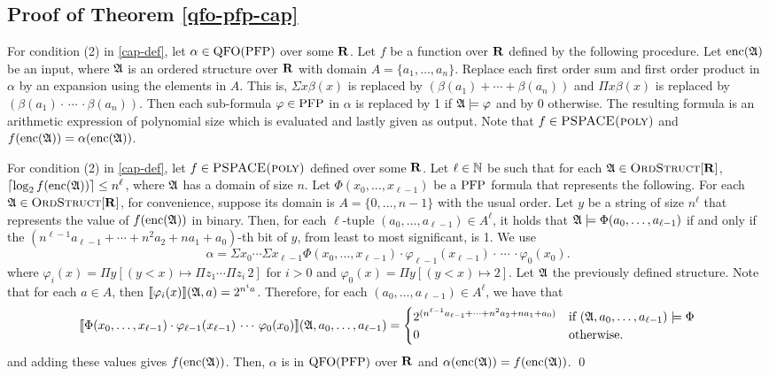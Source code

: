 \subsection{Proof of Theorem \ref{qfo-pfp-cap}}

For condition (2) in \ref{cap-def}, let $\alpha\in{\rm QFO}({\rm PFP})$ over some $\mathbf{R}$. Let $f$ be a function over $\mathbf{R}$ defined by the following procedure. Let ${\rm enc}(\mathfrak{A})$ be an input, where $\mathfrak{A}$ is an ordered structure over $\mathbf{R}$ with domain $A = \{a_1,\ldots,a_n\}$. Replace each first order sum and first order product in $\alpha$ by an expansion using the elements in $A$. This is, $\Sigma x \beta(x)$ is replaced by $(\beta(a_1)+\cdots+\beta(a_n))$ and $\Pi x \beta(x)$ is replaced by $(\beta(a_1)\cdot\,\cdots\,\cdot\beta(a_n))$. Then each sub-formula $\varphi\in{\rm PFP}$ in $\alpha$ is replaced by 1 if $\mathfrak{A}\models\varphi$ and by 0 otherwise. The resulting formula is an arithmetic expression of polynomial size which is evaluated and lastly given as output. Note that $f\in\text{\sc PSPACE(poly)}$ and $f({\rm enc}(\mathfrak{A})) = \alpha({\rm enc}(\mathfrak{A}))$.

For condition (2) in \ref{cap-def}, let $f\in \text{\sc PSPACE(poly)}$ defined over some $\mathbf{R}$. Let $\ell\in\mathbb{N}$ be such that for each $\mathfrak{A}\in\text{\sc OrdStruct}[\mathbf{R}]$, $\lceil\log_2 f({\rm enc}(\mathfrak{A})) \rceil \leq n^\ell$, where $\mathfrak{A}$ has a domain of size $n$. Let $\Phi(x_0,\ldots,x_{\ell-1})$ be a ${\rm PFP}$ formula that represents the following. For each $\mathfrak{A} \in \text{\sc OrdStruct}[\mathbf{R}]$, for convenience, suppose its domain is $A = \{0,\ldots,n-1\}$ with the usual order. Let $y$ be a string of size $n^{\ell}$ that represents the value of $f({\rm enc}(\mathfrak{A}))$ in binary. Then, for each $\ell$-tuple $(a_0,\ldots,a_{\ell-1}) \in A^{\ell}$, it holds that $\mathfrak{A} \models \Phi(a_0,\ldots,a_{\ell-1})$ if and only if the $(n^{\ell-1}a_{\ell-1} + \cdots + n^2 a_2 + n a_1 + a_0)$-th bit of $y$, from least to most significant, is 1. We use
$$
\alpha = \Sigma x_0 \cdots \Sigma x_{\ell-1} \Phi(x_0,\ldots,x_{\ell-1})\cdot\varphi_{\ell-1}(x_{\ell-1})\cdot\,\cdots\,\cdot\varphi_0(x_0).
$$
where $\varphi_i(x) = \Pi y[(y < x)\mapsto\Pi z_1\cdots\Pi z_i\,2]$ for $i > 0$ and $\varphi_0(x) = \Pi y[(y < x)\mapsto 2]$. Let $\mathfrak{A}$ the previously defined structure. Note that for each $a\in A$, then ${\llbracket{}{\varphi_i(x)}\rrbracket}(\mathfrak{A},a) = 2^{n^i a}$. Therefore, for each $(a_0,\ldots,a_{\ell-1})\in A^\ell$, we have that
$$
{\llbracket{}{\Phi(x_0,\ldots,x_{\ell-1})\cdot\varphi_{\ell-1}(x_{\ell-1})\,\cdots\,\varphi_0(x_0)}\rrbracket}(\mathfrak{A},a_0,\ldots,a_{\ell-1}) = 
\begin{cases}
2^{(n^{\ell-1}a_{\ell-1} + \cdots + n^2 a_2 + n a_1 + a_0)} &\text{if } (\mathfrak{A},a_0,\ldots,a_{\ell-1})\models\Phi \\
0 &\text{otherwise.}
\end{cases}
$$
and adding these values gives $f({\rm enc}(\mathfrak{A}))$. Then, $\alpha$ is in ${\rm QFO}({\rm PFP})$ over $\mathbf{R}$ and $\alpha({\rm enc}(\mathfrak{A})) = f({\rm enc}(\mathfrak{A}))$. \qed

